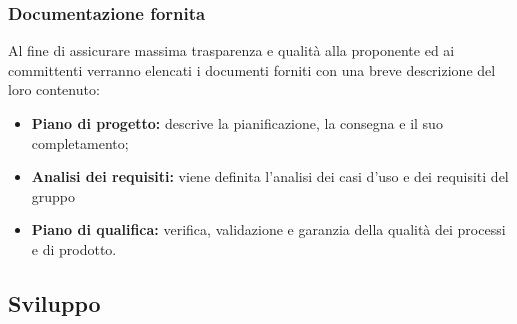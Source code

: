     \subsubsection{Documentazione fornita}
	    Al fine di assicurare massima trasparenza e qualità alla proponente ed ai committenti verranno elencati i documenti forniti con una breve descrizione del loro contenuto:
    	\begin{itemize}
	        \item \textbf{Piano di progetto:} descrive la pianificazione, la consegna e il suo completamento;
	        \item \textbf{Analisi dei requisiti:} viene definita l'analisi dei casi d'uso e dei requisiti del gruppo
	        \item \textbf{Piano di qualifica:} verifica, validazione e garanzia della qualità dei processi e di prodotto.
	    \end{itemize}
    \newpage    
\subsection{Sviluppo}
